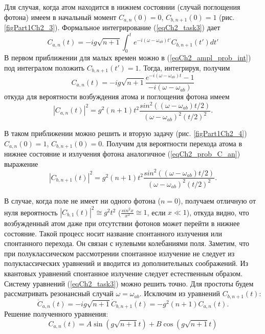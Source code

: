 

Для случая, когда атом находится в нижнем состоянии (случай поглощения
фотона) имеем в начальный момент  
$C_{a, n}\left(0\right) = 0$, $C_{b, n + 1}\left(0\right) = 1$
(рис. \ref{figPart1Ch2_3}). Формальное интегрирование (\ref{eqCh2_task3}) дает  
\begin{equation}
C_{a,n}\left(t\right) = -i g \sqrt{n + 1}
\int_0^t e^{-i \left(\omega - \omega_{ab}\right)t'} 
C_{b, n + 1}\left(t'\right) dt'
\label{eqCh2_ampl_prob_int}
\end{equation}
В первом приближении для малых времен можно в
(\ref{eqCh2_ampl_prob_int}) под интегралом 
положить $C_{b, n + 1}\left(t'\right) = 1$.  Тогда, интегрируя,
получим  
\begin{equation}
C_{a,n}\left(t\right) = -i g \sqrt{n + 1}
\frac{e^{-i \left(\omega - \omega_{ab}\right)t} - 1}
{-i \left(\omega - \omega_{ab}\right)}
\end{equation}
откуда для вероятности возбуждения атома и поглощения фотона имеем
\begin{equation}
\left|C_{a,n}\left(t\right)\right|^2 = g^2 \left(n + 1\right) t^2
\frac{sin^2\left(\left(\omega - \omega_{ab}\right)t/2\right)}
{\left(\omega - \omega_{ab}\right)^2\left(t/2\right)^2}. 
\label{eqCh2_prob_C_an}
\end{equation}



В таком приближении можно решить и вторую задачу (рис. \ref{figPart1Ch2_4}) 
$C_{a, n}\left(0\right) = 1$, $C_{b, n + 1}\left(0\right) = 0$. 
Получим для вероятности перехода атома в нижнее состояние и излучения
фотона аналогичное (\ref{eqCh2_prob_C_an}) выражение  
\begin{equation}
\left|C_{b, n + 1}\left(t\right)\right|^2 = g^2 \left(n + 1\right) t^2
\frac{sin^2\left(\left(\omega - \omega_{ab}\right)t/2\right)}
{\left(\omega - \omega_{ab}\right)^2\left(t/2\right)^2}.
\label{eqCh2_prob_C_bn}
\end{equation}

В случае, когда поле не имеет ни одного фотона  ($n = 0$),
получаем отличную от нуля вероятность 
$\left|C_{b, 1}\left(t\right)\right|^2 \cong g^2 t^2$
($\frac{sin^2 x}{x^2} \cong 1$,  если
$x \ll 1$), откуда видно, что возбужденный атом даже при
отсутствии фотонов может перейти в нижнее состояние. Такой процесс
носит название спонтанного излучения или спонтанного перехода. Он
связан с нулевыми колебаниями поля. Заметим, что при полуклассическом
рассмотрении спонтанное излучение не следует из полуклассических
уравнений и вводится из дополнительных соображений. Из квантовых
уравнений спонтанное излучение следует естественным образом. 
Систему уравнений (\ref{eqCh2_task3}) можно решить точно. Для простоты
будем рассматривать резонансный случай $\omega = \omega_{ab}$.
Исключим из уравнений $C_{b, n + 1}\left(t\right)$:   
\[
{\ddot C}_{a,n}\left(t\right) = -i g \sqrt{n + 1}
{\dot C}_{b, n + 1}\left(t\right) = -g^2 \left(n + 1\right)
C_{a,n}\left(t\right). 
\]
Решение полученного уравнения:
\begin{equation}
C_{a,n}\left(t\right) = A \sin\left(g \sqrt{n + 1} t\right) +
B \cos\left(g \sqrt{n + 1} t\right)
\end{equation}

